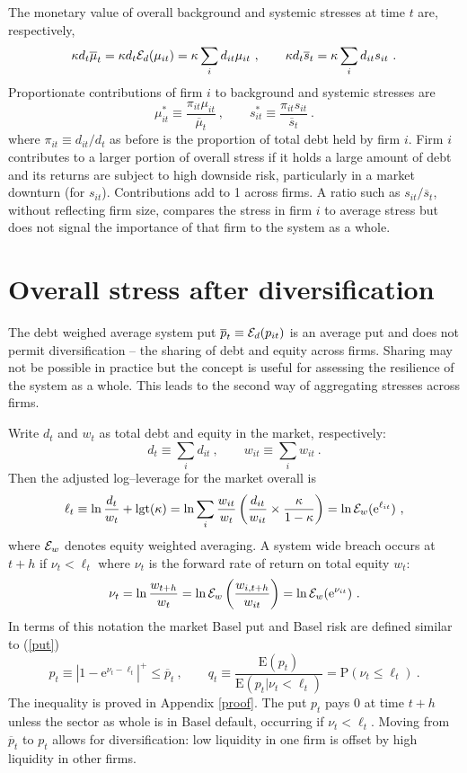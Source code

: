 \documentclass[12pt]{article}
\newcommand{\logit}{\mathrm{lgt}}
\newcommand{\E}{\mathrm{E}}
\newcommand{\p}{\mathrm{P}}
\newcommand{\e}{\mathrm{e}}
\newcommand{\Ex}{{\cal E}}
\newcommand{\Exd}{\Ex_d}
\newcommand{\eref}[1]{(\ref{#1})}
\newcommand{\aref}[1]{Appendix \ref{#1}}
\newcommand{\cq}{\ , \qquad}
\newcommand{\be}[1]{\begin{equation}\label{#1}}
\newcommand{\ee}{\end{equation}}
\begin{document}
The monetary value of overall background and systemic stresses at time $t$ are, respectively,
$$
\kappa d_t\overline\mu_t = \kappa d_t\Exd(\mu_{it}) = \kappa\sum_i d_{it}\mu_{it}\cq \kappa d_t\overline s_t  = \kappa\sum_i d_{it}s_{it}\ .
$$
Proportionate contributions of firm $i$ to background and systemic stresses are
\be{standardised}
\mu_{it}^*\equiv \frac{\pi_{it}\mu_{it}}{\overline \mu_t} \cq s_{it}^*\equiv\frac{\pi_{it}s_{it}}{\overline s_t}\ .
\ee
where $\pi_{it}\equiv d_{it}/d_t$ as before is the proportion of total debt held by firm $i$. Firm $i$ contributes to a larger portion of overall stress if it holds a large amount of debt and its returns are subject to high downside risk, particularly in a market downturn (for $s_{it}$). Contributions add to 1 across firms.  A ratio such as $s_{it}/\overline s_t$, without reflecting firm size, compares the stress in firm $i$ to average stress but does not signal the importance of that firm to the system as a whole.


\section{Overall stress after diversification}\label{aggregate1}

The debt weighed average system  put $\overline p_t\equiv\Ex_d(p_{it})$ is an average put and does not permit  diversification -- the  sharing of debt and equity across firms.   Sharing may not be possible in practice but the concept is useful for assessing the resilience of the system as a whole.   This leads to the second way of aggregating stresses across firms.

Write  $d_t$ and $w_t$ as total debt and equity in the market, respectively:
$$
d_t \equiv \sum_i d_{it}\cq w_{it} \equiv \sum_i w_{it}\ .
$$
Then the   adjusted log--leverage for the market overall is
$$
\ell_t \equiv  \ln \frac{d_t}{w_t} +\logit(\kappa) =  \ln \sum_i\frac{w_{it}}{w_t}\left(\frac{ d_{it}}{ w_{it}}\times \frac{\kappa}{1-\kappa}\right) = \ln \Ex_w(\e^{\ell_{it}}) \ ,
$$
where $\Ex_w$ denotes equity weighted averaging.  A system wide breach occurs at $t+h$ if
$
\nu_t < \ell_t
$
where $\nu_t$ is the forward rate of return on total equity $w_t$:
\be{ew}
 \nu_t =  \ln \frac{w_{t+h}}{w_t} = \ln\Ex_w\left(\frac{w_{i,t+h}}{w_{it}}\right) = \ln \Ex_w(\e^{\nu_{it}})\ .
\ee
In terms of this notation the market Basel put  and Basel risk are defined similar to \eref{put}
$$
p_t\equiv \left|1-\e^{\nu_t-\ell_t}\right|^+\le \overline p_t\cq q_t\equiv \frac{\E(p_t)}{\E(p_{t}|\nu_t<\ell_t)}=\p(\nu_t\le \ell_t) \ .
$$
The inequality is proved in  \aref{proof}.  The  put $p_t$ pays 0 at time $t+h$ unless the sector as whole is in Basel default, occurring if $\nu_t  <  \ell_t$. Moving from $\overline p_t$ to $p_t$  allows for diversification:   low liquidity  in one firm is offset by high liquidity  in other  firms.
\end{document}
